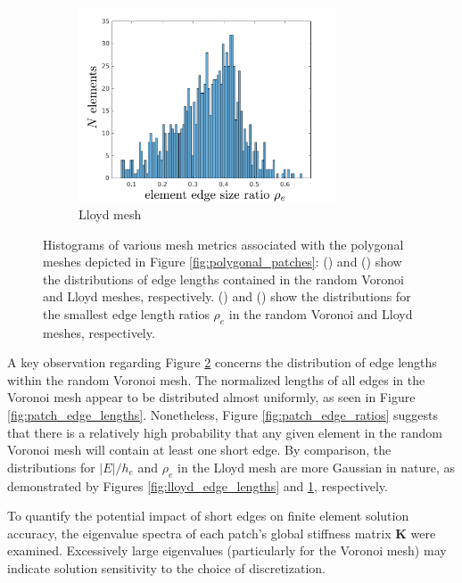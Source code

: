 \begin{figure}[!h]
\begin{subfigure}[b]{0.49\linewidth}
    \end{subfigure}
	\begin{subfigure}[b]{0.49\linewidth}
            \centering
            \includegraphics[width=3.0in]{figures/lloyd_edge_ratios.pdf}
    			\caption{Lloyd mesh \label{fig:lloyd_edge_ratios}}
    \end{subfigure}
    \caption{Histograms of various mesh metrics associated with the polygonal meshes depicted in Figure \ref{fig:polygonal_patches}:  () and () show the distributions of edge lengths contained in the random Voronoi and Lloyd meshes, respectively. () and () show the distributions for the smallest edge length ratios $\rho_e$ in the random Voronoi and Lloyd meshes, respectively.}
    \label{fig:patch_edge_metrics}
\end{figure}

A key observation regarding Figure \ref{fig:patch_edge_metrics} concerns the distribution of edge lengths within the random Voronoi mesh. The normalized lengths of all edges in the Voronoi mesh appear to be distributed almost uniformly, as seen in Figure \ref{fig:patch_edge_lengths}. Nonetheless, Figure \ref{fig:patch_edge_ratios} suggests that there is a relatively high probability that any given element in the random Voronoi mesh will contain at least one short edge. By comparison, the distributions for $|E|/h_e$ and $\rho_e$ in the Lloyd mesh are more Gaussian in nature, as demonstrated by Figures \ref{fig:lloyd_edge_lengths} and \ref{fig:lloyd_edge_ratios}, respectively.

To quantify the potential impact of short edges on finite element solution accuracy, the eigenvalue spectra of each patch's global stiffness matrix $\bm{K}$ were examined. Excessively large eigenvalues (particularly for the Voronoi mesh) may indicate solution sensitivity to the choice of discretization.

